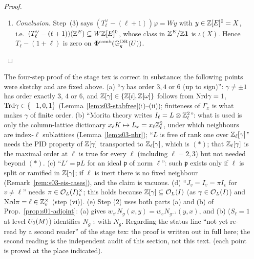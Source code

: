 \begin{proof}
\begin{enumerate}[label=(\arabic*)]
  \[y_e:=\sum_{e'\ne e}S(e,e')\big(\varphi(e')-\varphi(e)\big)\in\Z .\]
  Moreover $\sum_ey_e=\sum_{e\ne e'}S(e,e')\varphi(e')-\sum_{e\ne e'}S(e,e')\varphi(e)=0$: exchanging the names $e\leftrightarrow e'$ in the first sum and using
  $S(e',e)=S(e,e')$ turns it into the second. So $y:=\sum_ey_ee\in\Z[E]^0$.
\item \emph{Conclusion.} Step~(3) says $(T_\ell^\vee-(\ell+1))\varphi=Wy$ with $y\in\mathbb{Z}[E]^0=X$, i.e.\ $(T_\ell^\vee-(\ell+1))(\mathbb{Z}^E)\subseteq W\mathbb{Z}[E]^0$, whose class in
  $\mathbb{Z}^E/\mathbb{Z}\mathbf1$ is $\iota(X)$. Hence $T_\ell-(1+\ell)$ is zero on $\Phi^{\mathrm{comb}}(\mathbb{G}^{\mathrm{DR}}_q(U))$. \qedhere
\end{enumerate}
\end{proof}

\begin{remark}\label{rem:s03-eis-corr}
The four-step proof of the stage tex is correct in substance; the following points were sketchy and are fixed above. (a) ``$\gamma$ has order $3,4$ or $6$
(up to sign)'': $\gamma\ne\pm1$ has order exactly $3$, $4$ or $6$, and $\mathbb{Z}[\gamma]\in\{\mathbb{Z}[i],\mathbb{Z}[\omega]\}$ follows from $\mathrm{Nrd}\gamma=1$, $\mathrm{Trd}\gamma\in\{-1,0,1\}$
(Lemma~\ref{lem:s03-stabfree}(i)--(ii)); finiteness of $\Gamma_x$ is what makes $\gamma$ of finite order. (b) ``Morita theory writes $I_\ell=L\otimes\mathbb{Z}_\ell^2$'':
what is used is only the column-lattice dictionary $x_\ell K\mapsto L_x=x_\ell\mathbb{Z}_\ell^2$, under which neighbours are index-$\ell$ sublattices
(Lemma~\ref{lem:s03-nbr}); ``$L$ is free of rank one over $\mathbb{Z}_\ell[\gamma]$'' needs the PID property of $\mathbb{Z}[\gamma]$ transported to $\mathbb{Z}_\ell[\gamma]$, which
is $(*)$; that $\mathbb{Z}_\ell[\gamma]$ is the maximal order at $\ell$ is true for every $\ell$ (including $\ell=2,3$) but not needed beyond $(*)$. (c) ``$L'=\mathfrak pL$ for
an ideal $\mathfrak p$ of norm $\ell$'': such $\mathfrak p$ exists only if $\ell$ is split or ramified in $\mathbb{Z}[\gamma]$; if $\ell$ is inert there is no fixed
neighbour (Remark~\ref{rem:s03-eis-cases}), and the claim is vacuous. (d) ``$J_v=I_v=\pi I_v$ for $v\ne\ell$'' needs $\pi\in\mathcal{O}_L(I)_v^\times$; this holds
because $\mathbb{Z}[\gamma]\subseteq\mathcal{O}_L(I)$ (as $\gamma\in\mathcal{O}_L(I)$) and $\mathrm{Nrd}\pi=\ell\in\mathbb{Z}_v^\times$ (step (vi)). (e) Step (2) uses both parts (a) and (b) of
Prop.~\ref{prop:s01-adjoint}: (a) gives $w_{e'}N_g(x,y)=w_eN_{g^{-1}}(y,x)$, and (b) ($S_\ell=1$ at level $U_0(M)$) identifies $N_{g^{-1}}$ with $N_g$.
Regarding the status line ``not yet re-read by a second reader'' of the stage tex: the proof is written out in full here; the second reading is the
independent audit of this section, not this text. \stproved{} (each point is proved at the place indicated).
\end{remark}

